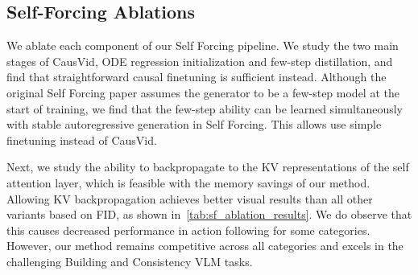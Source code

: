 \subsection{Self-Forcing Ablations}
\label{subsec:sf_ablations}

We ablate each component of our Self Forcing pipeline. We study the two main stages of CausVid, ODE regression initialization and few-step distillation, and find that straightforward causal finetuning is sufficient instead. Although the original Self Forcing paper assumes the generator to be a few-step model at the start of training, we find that the few-step ability can be learned simultaneously with stable autoregressive generation in Self Forcing. This allows use simple finetuning instead of CausVid.

Next, we study the ability to backpropagate to the KV representations of the self attention layer, which is feasible with the memory savings of our method. Allowing KV backpropagation achieves better visual results than all other variants based on FID, as shown in~\cref{tab:sf_ablation_results}. We do observe that this causes decreased performance in action following for some categories. However, our method remains competitive across all categories and excels in the challenging Building and Consistency VLM tasks.


